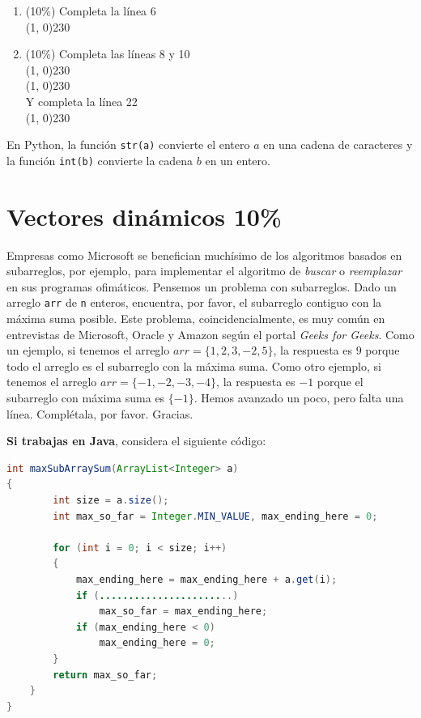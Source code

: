 \documentclass[10 pt]{article}
\begin{document}
\begin{enumerate}[label=(\Alph*)]
 
  \item (10\%) Completa la línea 6\\
  \line(1, 0){230}\\
  \item (10\%) Completa las líneas 8 y 10\\
  \line(1, 0){230} \\
  \line(1, 0){230}\\
  Y completa la línea 22\\
  \line(1, 0){230}
\end{enumerate}

En Python, la función \texttt{str(a)} convierte el entero $a$ en una cadena de caracteres y la función \texttt{int(b)} convierte la cadena $b$ en un entero.

\newpage

\section{Vectores dinámicos 10\%}

Empresas como Microsoft se benefician muchísimo de los algoritmos basados en subarreglos, por ejemplo, para implementar el algoritmo de \textit{buscar} o \textit{reemplazar} en sus programas ofimáticos. Pensemos un problema con subarreglos. Dado un arreglo \texttt{arr} de \texttt{n} enteros, encuentra, por favor, el subarreglo contiguo con la máxima suma posible. Este problema, coincidencialmente, es muy común en entrevistas de Microsoft, Oracle y Amazon según el portal \textit{Geeks for Geeks}. Como un ejemplo, si tenemos el arreglo $arr = \{1,2,3,-2,5\}$, la respuesta es $9$ porque todo el arreglo es el subarreglo con la máxima suma. Como otro ejemplo, si tenemos el arreglo $arr = \{-1, -2, -3, -4 \}$, la respuesta es $-1$ porque el subarreglo
con máxima suma es $\{-1\}$. Hemos avanzado un poco, pero falta una línea. Complétala, por favor. Gracias.

\hspace{1cm}

\textbf{Si trabajas en Java}, considera el siguiente código:

\begin{lstlisting}[language = Java]
int maxSubArraySum(ArrayList<Integer> a)
{
        int size = a.size();
        int max_so_far = Integer.MIN_VALUE, max_ending_here = 0;
 
        for (int i = 0; i < size; i++)
        {
            max_ending_here = max_ending_here + a.get(i);
            if (.......................) 
                max_so_far = max_ending_here;
            if (max_ending_here < 0)
                max_ending_here = 0;
        }
        return max_so_far;
    }
}
\end{lstlisting}
\end{document}
